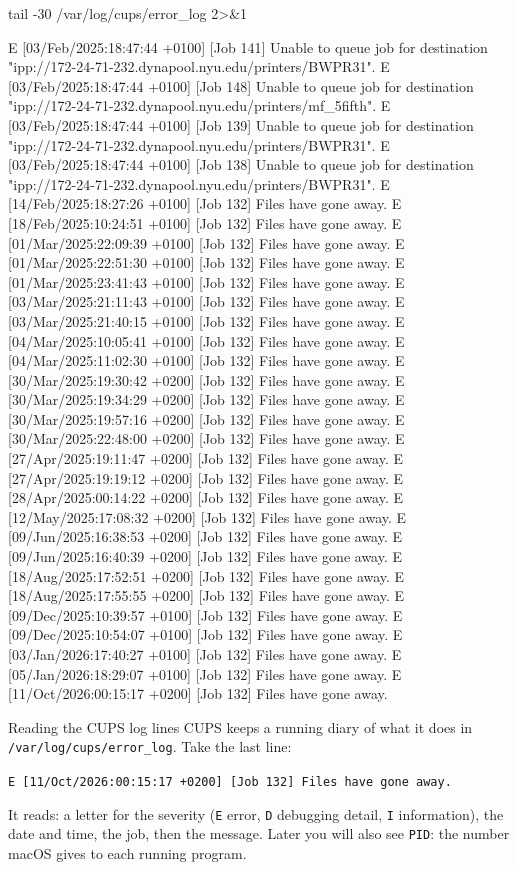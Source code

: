 \documentclass[11pt,a4paper]{article}
\begin{document}
\begin{mine}
tail -30 /var/log/cups/error_log 2>&1
\end{mine}
\begin{cmdout}
E [03/Feb/2025:18:47:44 +0100] [Job 141] Unable to queue job for destination "ipp://172-24-71-232.dynapool.nyu.edu/printers/BWPR31".
E [03/Feb/2025:18:47:44 +0100] [Job 148] Unable to queue job for destination "ipp://172-24-71-232.dynapool.nyu.edu/printers/mf_5fifth".
E [03/Feb/2025:18:47:44 +0100] [Job 139] Unable to queue job for destination "ipp://172-24-71-232.dynapool.nyu.edu/printers/BWPR31".
E [03/Feb/2025:18:47:44 +0100] [Job 138] Unable to queue job for destination "ipp://172-24-71-232.dynapool.nyu.edu/printers/BWPR31".
E [14/Feb/2025:18:27:26 +0100] [Job 132] Files have gone away.
E [18/Feb/2025:10:24:51 +0100] [Job 132] Files have gone away.
E [01/Mar/2025:22:09:39 +0100] [Job 132] Files have gone away.
E [01/Mar/2025:22:51:30 +0100] [Job 132] Files have gone away.
E [01/Mar/2025:23:41:43 +0100] [Job 132] Files have gone away.
E [03/Mar/2025:21:11:43 +0100] [Job 132] Files have gone away.
E [03/Mar/2025:21:40:15 +0100] [Job 132] Files have gone away.
E [04/Mar/2025:10:05:41 +0100] [Job 132] Files have gone away.
E [04/Mar/2025:11:02:30 +0100] [Job 132] Files have gone away.
E [30/Mar/2025:19:30:42 +0200] [Job 132] Files have gone away.
E [30/Mar/2025:19:34:29 +0200] [Job 132] Files have gone away.
E [30/Mar/2025:19:57:16 +0200] [Job 132] Files have gone away.
E [30/Mar/2025:22:48:00 +0200] [Job 132] Files have gone away.
E [27/Apr/2025:19:11:47 +0200] [Job 132] Files have gone away.
E [27/Apr/2025:19:19:12 +0200] [Job 132] Files have gone away.
E [28/Apr/2025:00:14:22 +0200] [Job 132] Files have gone away.
E [12/May/2025:17:08:32 +0200] [Job 132] Files have gone away.
E [09/Jun/2025:16:38:53 +0200] [Job 132] Files have gone away.
E [09/Jun/2025:16:40:39 +0200] [Job 132] Files have gone away.
E [18/Aug/2025:17:52:51 +0200] [Job 132] Files have gone away.
E [18/Aug/2025:17:55:55 +0200] [Job 132] Files have gone away.
E [09/Dec/2025:10:39:57 +0100] [Job 132] Files have gone away.
E [09/Dec/2025:10:54:07 +0100] [Job 132] Files have gone away.
E [03/Jan/2026:17:40:27 +0100] [Job 132] Files have gone away.
E [05/Jan/2026:18:29:07 +0100] [Job 132] Files have gone away.
E [11/Oct/2026:00:15:17 +0200] [Job 132] Files have gone away.
\end{cmdout}

\begin{insight}{Reading the CUPS log lines}
CUPS keeps a running diary of what it does in \texttt{/var/log/cups/error\_log}. Take the last line:
\begin{center}\texttt{E [11/Oct/2026:00:15:17 +0200] [Job 132] Files have gone away.}\end{center}
It reads: a letter for the severity (\texttt{E} error, \texttt{D} debugging detail, \texttt{I} information), the date and time, the job, then the message. Later you will also see \texttt{PID}: the number macOS gives to each running program.
\end{insight}
\end{document}
